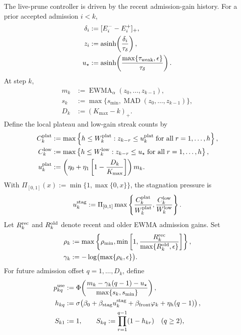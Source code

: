 \documentclass[
  reprint,
  amsmath,
  amssymb,
  aps,
  pra,
  nofootinbib,
  superscriptaddress,
  floatfix
]{revtex4-2}
\begin{document}
The live-prune controller is driven by the recent admission-gain history.  For a prior accepted admission \(i<k\),
\[
\begin{aligned}
\delta_i
&:=[E_i^- - E_i^+]_+,
\\
z_i
&:=\operatorname{asinh}\!\left(\frac{\delta_i}{\tau_\delta}\right),
\\
u_\star
&:=
\operatorname{asinh}\!\left(
\frac{\max\{\tau_{\rm weak},\epsilon\}}{\tau_\delta}
\right).
\end{aligned}
\]
At step \(k\),
\[
\begin{aligned}
m_k&:=\operatorname{EWMA}_\alpha(z_0,\ldots,z_{k-1}),
\\
s_k&:=\max\{s_{\min},\operatorname{MAD}(z_0,\ldots,z_{k-1})\},
\\
D_k&:=(K_{\max}-k)_+ .
\end{aligned}
\]
Define the local plateau and low-gain streak counts by
\[
\begin{aligned}
C_k^{\rm plat}
&:=
\max\left\{
h\le W_k^{\rm plat}:
z_{k-r}\le u_k^{\rm plat}
\; \text{for all}\; r=1,\ldots,h
\right\},
\\
C_k^{\rm low}
&:=
\max\left\{
h\le W_k^{\rm low}:
z_{k-r}\le u_\star
\; \text{for all}\; r=1,\ldots,h
\right\},
\\
u_k^{\rm plat}
&:=
\left(
\eta_0+\eta_1\left[1-\frac{D_k}{K_{\max}}\right]
\right)m_k .
\end{aligned}
\]
With \(\Pi_{[0,1]}(x):=\min\{1,\max\{0,x\}\}\), the stagnation pressure is
\[
u_k^{\rm stag}
:=
\Pi_{[0,1]}
\max\left\{
\frac{C_k^{\rm plat}}{W_k^{\rm plat}},
\frac{C_k^{\rm low}}{W_k^{\rm low}}
\right\}.
\]
Let \(R_k^{\rm rec}\) and \(R_k^{\rm old}\) denote recent and older EWMA admission gains.  Set
\[
\begin{aligned}
\rho_k
&:=
\max\left\{
\rho_{\min},
\min\left[
1,\frac{R_k^{\rm rec}}{\max\{R_k^{\rm old},\epsilon\}}
\right]
\right\},
\\
\gamma_k
&:=
-\log\bigl(\max\{\rho_k,\epsilon\}\bigr).
\end{aligned}
\]
For future admission offset \(q=1,\ldots,D_k\), define
\[
\begin{aligned}
p_{kq}^{\rm use}
&:=
\Phi\!\left(
\frac{m_k-\gamma_k(q-1)-u_\star}
{\max\{s_k,s_{\min}\}}
\right),
\\
h_{kq}
&:=
\sigma\!\left(
\beta_0+\beta_{\rm stag}u_k^{\rm stag}
+\beta_{\rm front}\varphi_k
+\eta_h(q-1)
\right),
\\
S_{k1}&:=1,\qquad
S_{kq}:=\prod_{r=1}^{q-1}(1-h_{kr})\quad(q\ge2),
\end{aligned}
\]
\end{document}
